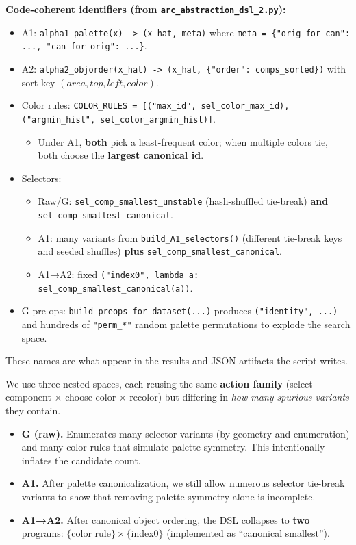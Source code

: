 \documentclass[11pt]{article}
\newcommand{\code}[1]{\texttt{#1}}
\begin{document}
\textbf{Code-coherent identifiers (from \code{arc\_abstraction\_dsl\_2.py}):}
\begin{itemize}
\item A1: \code{alpha1\_palette(x) -> (x\_hat, meta)} where \code{meta = \{"orig\_for\_can": ..., "can\_for\_orig": ...\}}.
\item A2: \code{alpha2\_objorder(x\_hat) -> (x\_hat, \{"order": comps\_sorted\})} with sort key $(area, top, left, color)$.
\item Color rules: \code{COLOR\_RULES = [("max\_id", sel\_color\_max\_id), ("argmin\_hist", sel\_color\_argmin\_hist)]}.
  \begin{itemize}
  \item Under A1, \textbf{both} pick a least-frequent color; when multiple colors tie, both choose the \textbf{largest canonical id}.
  \end{itemize}
\item Selectors:
  \begin{itemize}
  \item Raw/G: \code{sel\_comp\_smallest\_unstable} (hash-shuffled tie-break) \textbf{and} \code{sel\_comp\_smallest\_canonical}.
  \item A1: many variants from \code{build\_A1\_selectors()} (different tie-break keys and seeded shuffles) \textbf{plus} \code{sel\_comp\_smallest\_canonical}.
  \item A1→A2: fixed \code{("index0", lambda a: sel\_comp\_smallest\_canonical(a))}.
  \end{itemize}
\item G pre-ops: \code{build\_preops\_for\_dataset(...)} produces \code{("identity", ...)} and hundreds of \code{"perm\_*"} random palette permutations to explode the search space.
\end{itemize}

These names are what appear in the results and JSON artifacts the script writes.

We use three nested spaces, each reusing the same \textbf{action family} (select component $\times$ choose color $\times$ recolor) but differing in \emph{how many spurious variants} they contain.

\begin{itemize}
\item \textbf{G (raw).} Enumerates many selector variants (by geometry and enumeration) and many color rules that simulate palette symmetry. This intentionally inflates the candidate count.
\item \textbf{A1.} After palette canonicalization, we still allow numerous selector tie-break variants to show that removing palette symmetry alone is incomplete.
\item \textbf{A1→A2.} After canonical object ordering, the DSL collapses to \textbf{two} programs: $\{$color rule$\} \times \{$index0$\}$ (implemented as ``canonical smallest'').
\end{itemize}
\end{document}
